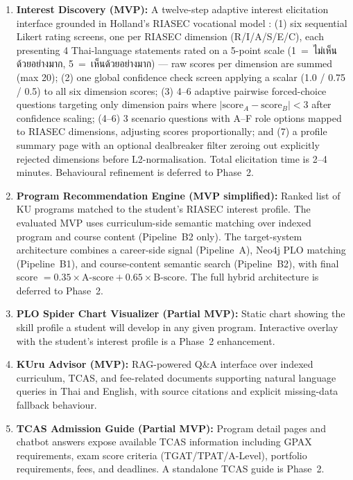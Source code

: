 \begin{enumerate}[leftmargin=80pt]
    \item \textbf{Interest Discovery (MVP):} A twelve-step adaptive interest elicitation interface grounded in Holland's RIASEC vocational model \cite{holland1997}: (1) six sequential Likert rating screens, one per RIASEC dimension (R/I/A/S/E/C), each presenting 4 Thai-language statements rated on a 5-point scale (1~=~ไม่เห็นด้วยอย่างมาก, 5~=~เห็นด้วยอย่างมาก) --- raw scores per dimension are summed (max 20); (2) one global confidence check screen applying a scalar (1.0 / 0.75 / 0.5) to all six dimension scores; (3) 4--6 adaptive pairwise forced-choice questions targeting only dimension pairs where $|\text{score}_A - \text{score}_B| < 3$ after confidence scaling; (4--6) 3 scenario questions with A--F role options mapped to RIASEC dimensions, adjusting scores proportionally; and (7) a profile summary page with an optional dealbreaker filter zeroing out explicitly rejected dimensions before L2-normalisation. Total elicitation time is 2--4 minutes. Behavioural refinement is deferred to Phase~2.

    \item \textbf{Program Recommendation Engine (MVP simplified):} Ranked list of KU programs matched to the student's RIASEC interest profile. The evaluated MVP uses curriculum-side semantic matching over indexed program and course content (Pipeline~B2 only). The target-system architecture combines a career-side signal (Pipeline~A), Neo4j PLO matching (Pipeline~B1), and course-content semantic search (Pipeline~B2), with final score $= 0.35 \times \text{A-score} + 0.65 \times \text{B-score}$. The full hybrid architecture is deferred to Phase~2.

    \item \textbf{PLO Spider Chart Visualizer (Partial MVP):} Static chart showing the skill profile a student will develop in any given program. Interactive overlay with the student's interest profile is a Phase~2 enhancement.

    \item \textbf{KUru Advisor (MVP):} RAG-powered Q\&A interface over indexed curriculum, TCAS, and fee-related documents supporting natural language queries in Thai and English, with source citations and explicit missing-data fallback behaviour.

    \item \textbf{TCAS Admission Guide (Partial MVP):} Program detail pages and chatbot answers expose available TCAS information including GPAX requirements, exam score criteria (TGAT/TPAT/A-Level), portfolio requirements, fees, and deadlines. A standalone TCAS guide is Phase~2.


\end{enumerate}
